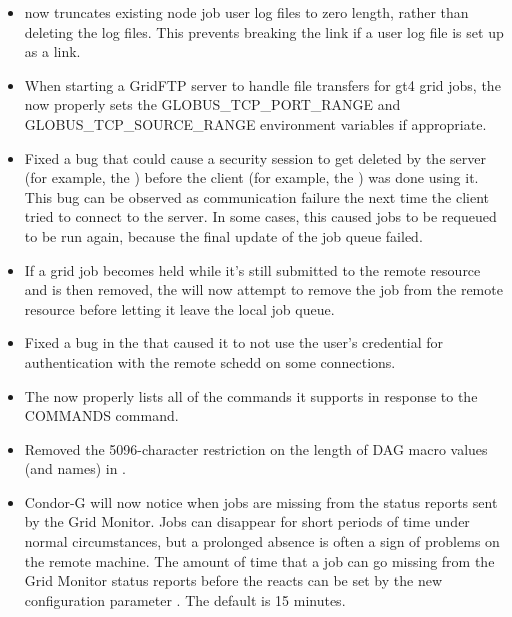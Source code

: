 \begin{itemize}
\item {} now truncates existing node job user log files
to zero length, rather than deleting the log files.  This prevents breaking the
link if a user log file is set up as a link.

\item When starting a GridFTP server to handle file transfers for gt4
grid jobs, the  now properly sets the
GLOBUS\_TCP\_PORT\_RANGE and GLOBUS\_TCP\_SOURCE\_RANGE environment
variables if appropriate.

\item Fixed a bug that could cause a security session to get deleted
by the server (for example, the ) before the client
(for example, the ) was done using it.
This bug can be observed as
communication failure the next time the client tried to connect to
the server.  In some cases, this caused jobs to be requeued to be run
again, because the final update of the job queue failed.

\item If a grid job becomes held while it's still submitted to the remote
resource and is then removed, the  will now attempt
to remove the job from the remote resource before letting it leave the
local job queue.

\item Fixed a bug in the  that caused it to not use the 
user's credential for authentication with the remote schedd on some 
connections.

\item The  now properly lists all of the commands it
supports in response to the COMMANDS command.

\item Removed the 5096-character restriction on the length of DAG
macro values (and names) in .

\item Condor-G will now notice when jobs are missing from the status
reports sent by the Grid Monitor.
Jobs can disappear for short periods of time under normal circumstances,
but a prolonged absence is often a sign of problems on the remote machine.
The amount of time that a job can go missing from the Grid Monitor
status reports before the  reacts can be set by the
new configuration parameter .
The default is 15 minutes.


\end{itemize}
